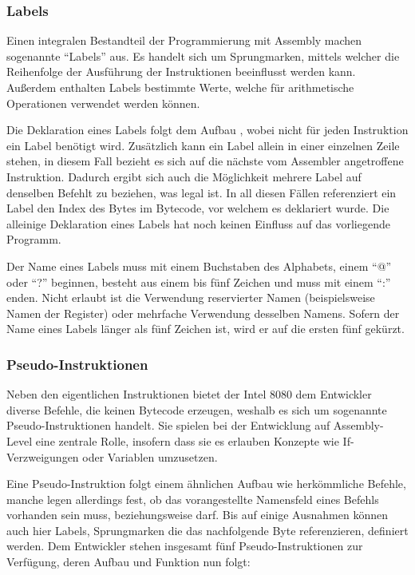 \subsubsection{Labels}\label{chap:labels}

Einen integralen Bestandteil der Programmierung mit Assembly machen sogenannte \enquote{Labels} aus. Es handelt sich um Sprungmarken, mittels welcher die Reihenfolge der Ausführung der Instruktionen beeinflusst werden kann. Außerdem enthalten Labels bestimmte Werte, welche für arithmetische Operationen verwendet werden können.

Die Deklaration eines Labels folgt dem Aufbau , wobei nicht für jeden Instruktion ein Label benötigt wird. Zusätzlich kann ein Label allein in einer einzelnen Zeile stehen, in diesem Fall bezieht es sich auf die nächste vom Assembler angetroffene Instruktion. Dadurch ergibt sich auch die Möglichkeit mehrere Label auf denselben Befehlt zu beziehen, was legal ist. In all diesen Fällen referenziert ein Label den Index des Bytes im Bytecode, vor welchem es deklariert wurde. Die alleinige Deklaration eines Labels hat noch keinen Einfluss auf das vorliegende Programm.

Der Name eines Labels muss mit einem Buchstaben des Alphabets, einem \enquote{@} oder \enquote{?} beginnen, besteht aus einem bis fünf Zeichen und muss mit einem  \enquote{:} enden. Nicht erlaubt ist die Verwendung reservierter Namen (beispielsweise Namen der Register) oder mehrfache Verwendung desselben Namens. Sofern der Name eines Labels länger als fünf Zeichen ist, wird er auf die ersten fünf gekürzt.

\subsubsection{Pseudo-Instruktionen}\label{chap:pseudo-instructions}

Neben den eigentlichen Instruktionen bietet der Intel 8080 dem Entwickler diverse Befehle, die keinen Bytecode erzeugen, weshalb es sich um sogenannte \glqq Pseudo-Instruktionen\grqq{} handelt. Sie spielen bei der Entwicklung auf Assembly-Level eine zentrale Rolle, insofern dass sie es erlauben Konzepte wie If-Verzweigungen oder Variablen umzusetzen.

Eine Pseudo-Instruktion folgt einem ähnlichen Aufbau wie herkömmliche Befehle, manche legen allerdings fest, ob das vorangestellte Namensfeld eines Befehls vorhanden sein muss, beziehungsweise darf. Bis auf einige Ausnahmen können auch hier Labels, Sprungmarken die das nachfolgende Byte referenzieren, definiert werden. Dem Entwickler stehen insgesamt fünf Pseudo-Instruktionen zur Verfügung, deren Aufbau und Funktion nun folgt:

